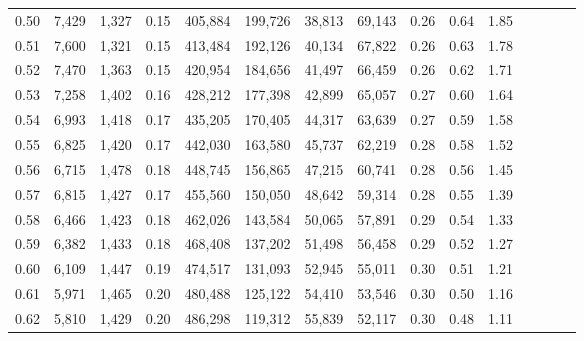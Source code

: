 \begin{tabular}{rrrcrrrrrrrrrrr}
0.50 &   7,429 &  1,327 &                                       0.15 &  405,884 &  199,726 &   38,813 &   69,143 &  0.26 &  0.64 &                         1.85 \\
0.51 &   7,600 &  1,321 &                                       0.15 &  413,484 &  192,126 &   40,134 &   67,822 &  0.26 &  0.63 &                         1.78 \\
0.52 &   7,470 &  1,363 &                                       0.15 &  420,954 &  184,656 &   41,497 &   66,459 &  0.26 &  0.62 &                         1.71 \\
0.53 &   7,258 &  1,402 &                                       0.16 &  428,212 &  177,398 &   42,899 &   65,057 &  0.27 &  0.60 &                         1.64 \\
0.54 &   6,993 &  1,418 &                                       0.17 &  435,205 &  170,405 &   44,317 &   63,639 &  0.27 &  0.59 &                         1.58 \\
0.55 &   6,825 &  1,420 &                                       0.17 &  442,030 &  163,580 &   45,737 &   62,219 &  0.28 &  0.58 &                         1.52 \\
0.56 &   6,715 &  1,478 &                                       0.18 &  448,745 &  156,865 &   47,215 &   60,741 &  0.28 &  0.56 &                         1.45 \\
0.57 &   6,815 &  1,427 &                                       0.17 &  455,560 &  150,050 &   48,642 &   59,314 &  0.28 &  0.55 &                         1.39 \\
0.58 &   6,466 &  1,423 &                                       0.18 &  462,026 &  143,584 &   50,065 &   57,891 &  0.29 &  0.54 &                         1.33 \\
0.59 &   6,382 &  1,433 &                                       0.18 &  468,408 &  137,202 &   51,498 &   56,458 &  0.29 &  0.52 &                         1.27 \\
0.60 &   6,109 &  1,447 &                                       0.19 &  474,517 &  131,093 &   52,945 &   55,011 &  0.30 &  0.51 &                         1.21 \\
0.61 &   5,971 &  1,465 &                                       0.20 &  480,488 &  125,122 &   54,410 &   53,546 &  0.30 &  0.50 &                         1.16 \\
0.62 &   5,810 &  1,429 &                                       0.20 &  486,298 &  119,312 &   55,839 &   52,117 &  0.30 &  0.48 &                         1.11 \\

\end{tabular}
